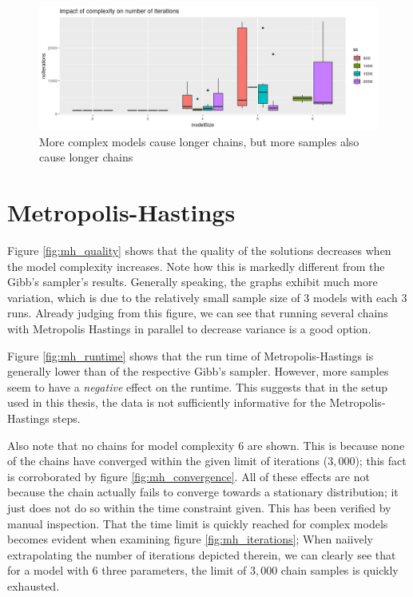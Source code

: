 \begin{figure}
	\includegraphics[width=\linewidth]{img/sim_bern_gibbs_iterations.png}
	\caption{More complex models cause longer chains, but more samples also cause longer chains }
	\label{fig:gibbs_iterations}
\end{figure}



\section{Metropolis-Hastings}
\label{chap:mh}

Figure \ref{fig:mh_quality} shows that the quality of the solutions decreases when the model complexity increases. Note how this is markedly different from the Gibb's sampler's results. Generally speaking, the graphs exhibit much more variation, which is due to the relatively small sample size of $3$ models with each $3$ runs. Already judging from this figure, we can see that running several chains with Metropolis Hastings in parallel to decrease variance is a good option.

Figure \ref{fig:mh_runtime} shows that the run time of Metropolis-Hastings is generally lower than of the respective Gibb's sampler. However, more samples seem to have a \textit{negative} effect on the runtime. This suggests that in the setup used in this thesis, the data is not sufficiently informative for the Metropolis-Hastings steps. 

Also note that no chains for model complexity $6$ are shown. This is because none of the chains have converged within the given limit of iterations ($3,000$); this fact is corroborated by figure \ref{fig:mh_convergence}.  All of these effects are not because the chain actually fails to converge towards a stationary distribution; it just does not do so within the time constraint given. This has been verified by manual inspection. That the time limit is quickly reached for complex models becomes evident when examining figure \ref{fig:mh_iterations}; When naiively extrapolating the number of iterations depicted therein, we can clearly see that for a model with $6$ three parameters, the limit of $3,000$ chain samples is quickly exhausted. 


